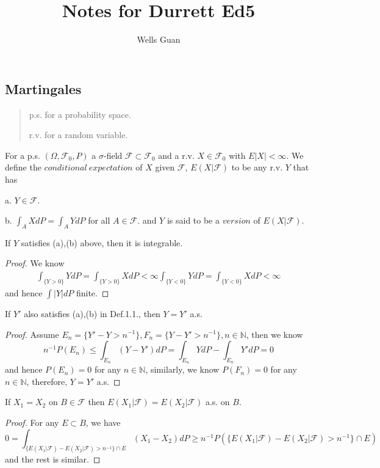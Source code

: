 \documentclass[lang=en, color=blue, ]{elegantbook}
\title{Notes for Durrett Ed5}
\author{Wells Guan}
\newcommand{\F}{\mathcal{F}}
\newcommand{\N}{\mathbb{N}}
\begin{document}


\chapter{}
\section{Martingales}
\begin{quotation}
p.s. for a probability space.\par
r.v. for a random variable.\par
\end{quotation}
\begin{definition}
For a p.s. $(\Omega, \F_0,P)$ a $\sigma$-field $\F \subset \F_0$ and a r.v. $X\in\F_0$ with $E|X|<\infty$. We define the $conditional\ expectation$ of $X$ given $\F$, $E(X|\F)$ to be any r.v. $Y$ that has\par
a. $Y\in\F$.\par
b. $\int_A X dP = \int_A YdP$ for all $A\in\F$.
and $Y$ is said to be a $version$ of $E(X|\F)$.
\end{definition}

\begin{lemma}
    If $Y$ satisfies (a),(b) above, then it is integrable.
\end{lemma}
\begin{proof}\par
    We know
    \[
    \begin{aligned}
    \int_{\{Y>0\}} YdP = \int_{\{Y>0\}} XdP < \infty
    \int_{\{Y<0\}} YdP = \int_{\{Y<0\}} XdP <\infty
    \end{aligned}
    \]
    and hence $\int |Y|dP$ finite.\par
\end{proof}
\begin{lemma}
    If $Y'$ also satisfies (a),(b) in Def.1.1., then $Y=Y'$ a.s.
\end{lemma}
\begin{proof}\par
    Assume $E_n = \{Y'-Y > n^{-1}\}, F_n = \{Y-Y' > n^{-1}\}, n\in \N$, then we know
    \[n^{-1}P(E_n) \leq \int_{E_n} (Y-Y')dP = \int_{E_n}Y dP - \int_{E_n} Y' dP = 0\]
    and hence $P(E_n)=0$ for any $n\in\N$, similarly, we know $P(F_n) = 0$ for any $n\in\N$, therefore, $Y=Y'$ a.s.
\end{proof}

\begin{theorem}
    If $X_1 = X_2$ on $B\in \F$ then $E(X_1|\F) = E(X_2|\F)$ a.s. on $B$.
\end{theorem}
\begin{proof}\par
    For any $E\subset B$, we have
    \[0 = \int_{\{E(X_1|\F)-E(X_2|\F)>n^{-1}\}\cap E} (X_1-X_2)dP \geq n^{-1}P(\{E(X_1|\F)-E(X_2|\F)>n^{-1}\}\cap E)\]
    and the rest is similar.\par
\end{proof}
\end{document}
